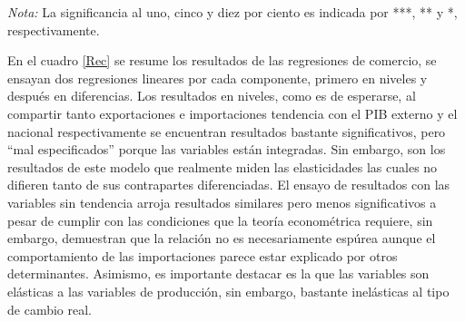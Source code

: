 \documentclass[12pt,letterpaper]{article}
\begin{document}
\begin{table}
\caption{Regresiones de Comercio}
\begin{center}
\end{center}
\begin{scriptsize}
\emph{Nota:} La significancia al uno, cinco y diez por ciento es indicada por ***, ** y *, respectivamente.
\end{scriptsize}								
\label{Rec}	
\end{table}	

En el cuadro \ref{Rec} se resume los resultados de las regresiones de comercio, se ensayan dos regresiones lineares por cada componente, primero en niveles y después en diferencias. Los resultados en niveles, como es de esperarse, al compartir tanto exportaciones e importaciones tendencia con el PIB externo y el nacional respectivamente se encuentran resultados bastante significativos, pero ``mal especificados'' porque las variables están integradas. Sin embargo, son los resultados de este modelo que realmente miden las elasticidades las cuales no difieren tanto de sus contrapartes diferenciadas. El ensayo de resultados con las variables sin tendencia arroja resultados similares pero menos significativos a pesar de cumplir con las condiciones que la teoría econométrica requiere, sin embargo, demuestran que la relación no es necesariamente espúrea aunque el comportamiento de las importaciones parece estar explicado por otros determinantes. Asimismo, es importante destacar es la que las variables son elásticas a las variables de producción, sin embargo, bastante inelásticas al tipo de cambio real.
\end{document}
